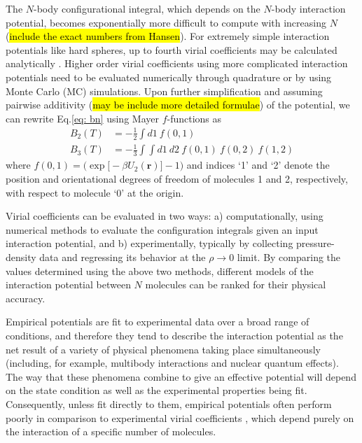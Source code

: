         The $N$-body configurational integral, which depends on the $N$-body interaction potential, becomes exponentially more difficult to compute with increasing $N$ (\hl{include the exact numbers from Hansen}). For extremely simple interaction potentials like hard spheres, up to fourth virial coefficients may be calculated analytically \cite{Masters2008}. Higher order virial coefficients using more complicated interaction potentials need to be evaluated numerically through quadrature or by using Monte Carlo (MC) simulations. Upon further simplification and assuming pairwise additivity (\hl{may be include more detailed formulae}) of the potential, we can rewrite Eq.\eqref{eq: bn} using Mayer $f$-functions as \cite{Masters2008,Hansen}
        \begin{equation} \label{eq: mayerfn}
            \begin{aligned}
                B_2(T) &= -\frac{1}{2} \displaystyle\int d1 ~ f(0,1)\\
                B_3(T) &= -\frac{1}{3} \displaystyle\int \int d1~d2~f(0,1)~f(0,2)~f(1,2)
            \end{aligned}
        \end{equation}
        where $f(0,1) = \Big( \exp \big[ -\beta U_2(\bm{r}) \big] - 1 \Big) $ and indices `1' and `2' denote the position and orientational degrees of freedom of molecules 1 and 2, respectively, with respect to molecule `0' at the origin.

        Virial coefficients can be evaluated in two ways: a) computationally, using numerical methods to evaluate the configuration integrals given an input interaction potential, and b) experimentally, typically by collecting pressure-density data and regressing its behavior at the $\rho \to 0$ limit. By comparing the values determined using the above two methods, different models of the interaction potential between $N$ molecules can be ranked for their physical accuracy.

        Empirical potentials are fit to experimental data over a broad range of conditions, and therefore they tend to describe the interaction potential as the net result of a variety of physical phenomena taking place simultaneously (including, for example, multibody interactions and nuclear quantum effects). The way that these phenomena combine to give an effective potential will depend on the state condition as well as the experimental properties being fit. Consequently, unless fit directly to them, empirical potentials often perform poorly in comparison to experimental virial coefficients \cite{Benjamin2007}, which depend purely on the interaction of a specific number of molecules.

